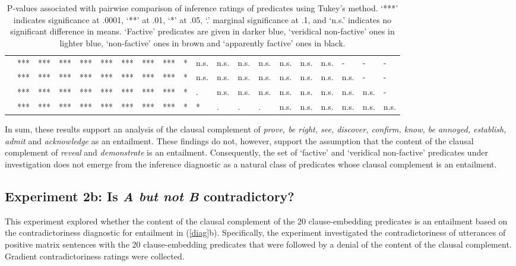 \documentclass[11pt,fleqn]{article}
\newcommand{\6}{\mbox{$[\hspace*{-.6mm}[$}}
\newcommand{\9}{\mbox{$]\hspace*{-.6mm}]$}}
\begin{document}
\begin{table}[h!]
\begin{tabular}{l l l l l l l l l l l l l l l l l l l l }
\color{blue}{\em discover}\color{black}			& *** & *** & *** & *** & *** & *** & *** & *** & * & n.s. & n.s. & n.s. & n.s. & n.s. & n.s. & n.s. & - & - & - \\
\color{blue}{\em see}\color{black}			& *** & *** & *** & *** & *** & *** & *** & *** & * & n.s. & n.s. & n.s. & n.s. & n.s. & n.s. & n.s. & n.s. & - & - \\
\color{airforceblue}{\em be right}\color{black}			& *** & *** & *** & *** & *** & *** & *** & *** & * & . & n.s. & n.s. & n.s. & n.s. & n.s. & n.s. & n.s. & n.s. & -  \\
\color{black}{\em prove}\color{black}		& *** & *** & *** & *** & *** & *** & *** & *** & *  & *  & . & . & . & n.s. & n.s. & n.s. & n.s. & n.s. & n.s.  \\

\bottomrule
\end{tabular}
\caption{P-values associated with pairwise comparison of inference ratings of predicates using Tukey's method. `***' indicates significance at .0001, `**' at .01, `*' at .05, `.' marginal significance at .1, and `n.s.' indicates no significant difference in means. `Factive' predicates are given in darker blue, `veridical non-factive' ones in lighter blue, `non-factive' ones in brown and `apparently factive' ones in black.}\label{t-pairwise2}
\end{table}

In sum, these results support an analysis of the clausal complement of {\em prove, be right, see, discover, confirm, know, be annoyed, establish, admit} and {\em acknowledge} as an entailment. These findings do not, however, support the assumption that the content of the clausal complement of {\em reveal} and {\em demonstrate} is an entailment. Consequently, the set of `factive' and `veridical non-factive' predicates under investigation does not emerge from the inference diagnostic as a natural class of predicates whose clausal complement is an entailment. 

\subsection{Experiment 2b: Is {\em A but not B} contradictory?}\label{s32}

This experiment explored whether the content of the clausal complement of the 20 clause-embedding predicates is an entailment based on the contradictoriness diagnostic for entailment in (\ref{diag}b). Specifically, the experiment investigated the contradictoriness of utterances of positive matrix sentences with the 20 clause-embedding predicates that were followed by a denial of the content of the clausal complement. Gradient contradictoriness ratings were collected.
\end{document}

